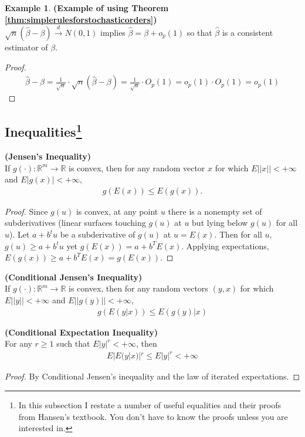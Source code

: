 \documentclass[11pt]{article} %
\theoremstyle{definition}
\numberwithin{defn}{subsection}
\numberwithin{thm}{subsection}
\newtheorem{ex}{Example}
\numberwithin{ex}{subsection}
\newcommand{\bb}[1]{\mathbb{#1}}
\newcommand{\R}{\bb{R}}
\newcommand{\dlim}{\overset{d}{\rightarrow}}
\newcommand{\bhat}{\hat{\beta}}
\begin{document}
\begin{ex}
	\textbf{(Example of using Theorem \ref{thm:simplerulesforstochasticorders})}\\
	$\sqrt{n}(\bhat-\beta)\dlim N(0,1)$ implies $\bhat=\beta+o_p(1)$ so that $\bhat$ is a consistent estimator of $\beta$.
	\begin{proof}
		\begin{align*}
		\bhat-\beta=\frac{1}{\sqrt{n}}\cdot\sqrt{n}(\bhat-\beta)=\frac{1}{\sqrt{n}}\cdot O_p(1)=o_p(1)\cdot O_p(1)=o_p(1)
		\end{align*}
	\end{proof}
\end{ex}


\subsection{Inequalities\footnote{In this subsection I restate a number of useful equalities and their proofs from Hansen's textbook. You don't have to know the proofs unless you are interested in.}}
\begin{thm}\label{thm:jensensineq}
	\textbf{(Jensen's Inequality)}\\
	If $g(\cdot):\R^m\rightarrow\R$ is convex, then for any random vector $x$ for which $E||x||<+\infty$ and $E|g(x)|<+\infty$,
	\begin{align*}
	g(E(x))\le E(g(x)).
	\end{align*}
	\begin{proof}
		Since $g(u)$ is convex, at any point $u$ there is a nonempty set of subderivatives (linear surfaces touching $g(u)$ at $u$ but lying below $g(u)$ for all $u$). Let $a+b^t u$ be a subderivative of $g(u)$ at $u=E(x)$. Then for all $u$, $g(u)\ge a+b^tu$ yet $g(E(x))=a+b^TE(x)$. Applying expectations, $E(g(x))\ge a+b^T E(x)=g(E(x))$.
	\end{proof}
\end{thm}

\begin{thm}\label{thm:conditionaljensensineq}
	\textbf{(Conditional Jensen's Inequality)}\\
	If $g(\cdot):\R^m\rightarrow\R$ is convex, then for any random vectors $(y,x)$ for which $E||y||<+\infty$ and $E||g(y)||<+\infty$,
	\begin{align*}
	g(E(y|x))\le E(g(y)|x)
	\end{align*}	
\end{thm}

\begin{thm}\label{thm:conditionalexpectationineq}
	\textbf{(Conditional Expectation Inequality)}\\
	For any $r\ge 1$ such that $E|y|^r<+\infty$, then
	\begin{align*}
	E|E(y|x)|^r\le E|y|^r <+\infty
	\end{align*}
	
	\begin{proof}
		By Conditional Jensen's inequality and the law of iterated expectations.
	\end{proof}	
\end{thm}
\end{document}
